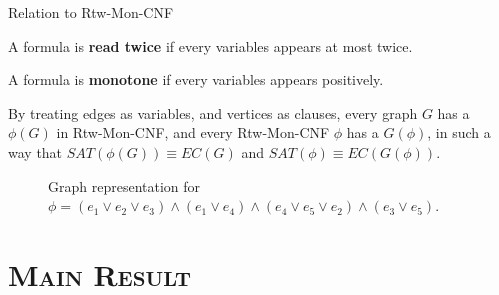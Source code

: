 \documentclass[mathserif]{beamer}
\begin{document}
\begin{frame}{Relation to Rtw-Mon-CNF}
    \begin{definition}
        A formula is {\bf read twice} if every variables appears at most twice.

        A formula is {\bf monotone} if every variables appears positively.
    \end{definition}
    \pause
By treating edges as variables, and vertices as clauses, 
every graph $G$ has a $\phi(G)$ in Rtw-Mon-CNF, and every Rtw-Mon-CNF $\phi$ has a $G(\phi)$,
in such a way that $SAT(\phi(G)) \equiv EC(G)$ and $SAT(\phi) \equiv EC(G(\phi))$.

\pause

	\begin{figure}[htp]
		\centering
		
		\caption{Graph representation for $\phi = (e_1 \vee e_2 \vee e_3) \wedge (e_1 \vee e_4) \wedge (e_4 \vee e_5 \vee e_2 ) \wedge (e_3 \vee e_5)$.}
	\end{figure}
\end{frame}


%	


\section{\scshape Main Result}
\end{document}
